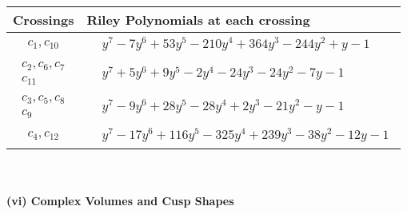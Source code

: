 \documentclass[1p]{elsarticle_modified}
\theoremstyle{definition}
\begin{document}
\begin{tabular}{m{50pt}|m{274pt}}
Crossings & \hspace{64pt}Riley Polynomials at each crossing \\
\hline $$\begin{aligned}c_{1},c_{10}\end{aligned}$$&$\begin{aligned}
&y^7-7 y^6+53 y^5-210 y^4+364 y^3-244 y^2+y-1
\end{aligned}$\\
\hline $$\begin{aligned}c_{2},c_{6},c_{7}\\c_{11}\end{aligned}$$&$\begin{aligned}
&y^7+5 y^6+9 y^5-2 y^4-24 y^3-24 y^2-7 y-1
\end{aligned}$\\
\hline $$\begin{aligned}c_{3},c_{5},c_{8}\\c_{9}\end{aligned}$$&$\begin{aligned}
&y^7-9 y^6+28 y^5-28 y^4+2 y^3-21 y^2- y-1
\end{aligned}$\\
\hline $$\begin{aligned}c_{4},c_{12}\end{aligned}$$&$\begin{aligned}
&y^7-17 y^6+116 y^5-325 y^4+239 y^3-38 y^2-12 y-1
\end{aligned}$\\
\hline
\end{tabular}\\~\\
\newpage\flushleft \textbf{(vi) Complex Volumes and Cusp Shapes}
\end{document}
